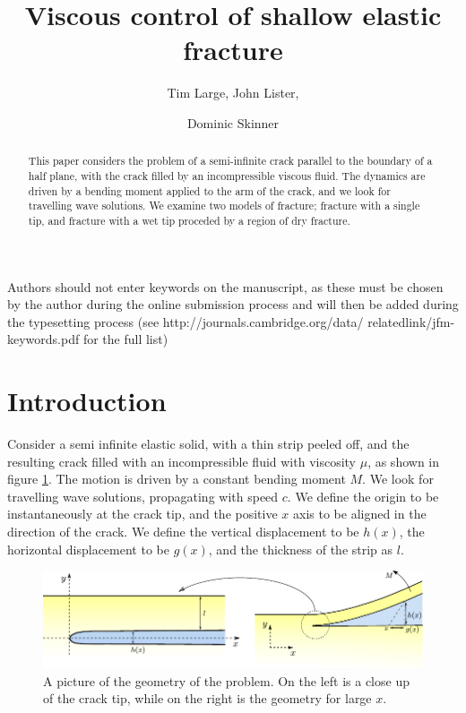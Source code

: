 \documentclass{jfm}
\title{Viscous control of shallow elastic fracture}
\author{Tim Large\aff{1},
  John Lister\aff{2},
 \and Dominic Skinner\aff{2}}
\affiliation{\aff{1} Massachusetts Institute of Technology, USA
\aff{2}Department of Applied Mathematics and Theoretical Physics, University of
Cambridge, UK}
\begin{document}
\maketitle

\begin{abstract}
This paper considers the problem of a semi-infinite crack parallel to the
boundary of a half plane, with the crack filled by an incompressible viscous
fluid. 
The dynamics are driven by a bending moment applied to the arm of the crack,
and we look for travelling wave solutions. We examine two models of fracture;
fracture with a single tip, and fracture with a wet tip proceded by a region
of dry fracture.
\end{abstract}

\begin{keywords}
Authors should not enter keywords on the manuscript, as these must be chosen 
by the author during the online submission process and will then be added 
during the typesetting process (see http://journals.cambridge.org/data/
\linebreak[3]relatedlink/jfm-\linebreak[3]keywords.pdf for the full list)
\end{keywords}

\section{Introduction}\label{sec:introduction}
Consider a semi infinite elastic solid, with a thin strip peeled off, and the
resulting crack filled with an incompressible fluid with viscosity $\mu$, as
shown in figure \ref{fig:diagram}. The motion is driven by a constant bending 
moment $M$. We look for travelling wave solutions, propagating with speed $c$. 
We define the origin to be instantaneously at the crack tip, and the positive 
$x$ axis to be aligned in the direction of the crack. We define the vertical 
displacement to be $h(x)$, the horizontal displacement to be $g(x)$, and the 
thickness of the strip as $l$.
%
\begin{figure}
  \centerline{\includegraphics{diag1.pdf}}\label{fig:diagram}
  \caption{A picture of the geometry of the problem. On the left is a close 
           up of the crack tip, while on the right is the geometry for large
           $x$.}
\end{figure}
%
\end{document}
